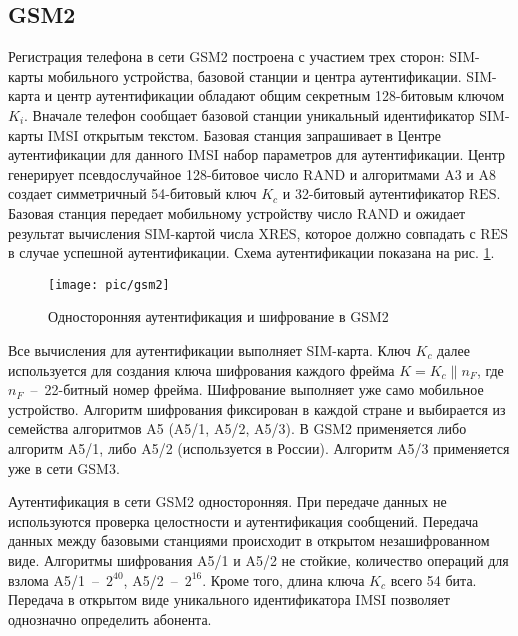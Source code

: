 \subsection{GSM2}

Регистрация телефона в сети GSM2 построена с участием трех сторон: SIM-карты мобильного устройства, базовой станции и центра аутентификации. SIM-карта и центр аутентификации обладают общим секретным 128-битовым ключом $K_i$. Вначале телефон сообщает базовой станции уникальный идентификатор SIM-карты IMSI открытым текстом. Базовая станция запрашивает в Центре аутентификации для данного IMSI набор параметров для аутентификации. Центр генерирует псевдослучайное 128-битовое число $\textrm{RAND}$ и алгоритмами A3 и A8 создает симметричный 54-битовый ключ $K_c$ и 32-битовый аутентификатор $\textrm{RES}$. Базовая станция передает мобильному устройству число $\textrm{RAND}$ и ожидает результат вычисления SIM-картой числа $\textrm{XRES}$, которое должно совпадать с $\textrm{RES}$ в случае успешной аутентификации. Схема аутентификации показана на рис. \ref{fig:gsm2}.

\begin{figure}[!ht]
	\centering
	\texttt{[image: pic/gsm2]}
	\caption{Односторонняя аутентификация и шифрование в GSM2\label{fig:gsm2}}
\end{figure}

Все вычисления для аутентификации выполняет SIM-карта. Ключ $K_c$ далее используется для создания ключа шифрования каждого фрейма $K = K_c \| n_F$, где $n_F$~--~22-битный номер фрейма. Шифрование выполняет уже само мобильное устройство. Алгоритм шифрования фиксирован в каждой стране и выбирается из семейства алгоритмов A5 (A5/1, A5/2, A5/3). В GSM2 применяется либо алгоритм A5/1, либо A5/2 (используется в России). Алгоритм A5/3 применяется уже в сети GSM3.

Аутентификация в сети GSM2 односторонняя. При передаче данных не используются проверка целостности и аутентификация сообщений. Передача данных между базовыми станциями происходит в открытом незашифрованном виде. Алгоритмы шифрования A5/1 и A5/2 не стойкие, количество операций для взлома A5/1~--~$2^{40}$, A5/2~--~$2^{16}$. Кроме того, длина ключа $K_c$ всего 54 бита. Передача в открытом виде уникального идентификатора IMSI позволяет однозначно определить абонента.
